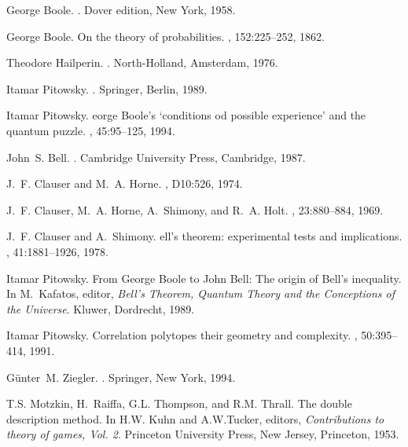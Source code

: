 \documentclass{epl}
\begin{document}
\begin{thebibliography}{10}

George Boole.
.
\newblock Dover edition, New York, 1958.

George Boole.
\newblock On the theory of probabilities.
,
  152:225--252, 1862.

Theodore Hailperin.
.
\newblock North-Holland, Amsterdam, 1976.

Itamar Pitowsky.
.
\newblock Springer, Berlin, 1989.

Itamar Pitowsky.
eorge {B}oole's `conditions od possible experience' and the
  quantum puzzle.
, 45:95--125, 1994.

John~S. Bell.
.
\newblock Cambridge University Press, Cambridge, 1987.

J.~F. Clauser and M.~A. Horne.
, D10:526, 1974.

J.~F. Clauser, M.~A. Horne, A.~Shimony, and R.~A. Holt.
, 23:880--884, 1969.

J.~F. Clauser and A.~Shimony.
ell's theorem: experimental tests and implications.
, 41:1881--1926, 1978.

Itamar Pitowsky.
\newblock From {G}eorge {B}oole to {J}ohn {B}ell: The origin of {B}ell's
  inequality.
\newblock In M.~Kafatos, editor, {\em {B}ell's Theorem, Quantum Theory and the
  Conceptions of the Universe}. Kluwer, Dordrecht, 1989.

Itamar Pitowsky.
\newblock Correlation polytopes their geometry and complexity.
, 50:395--414, 1991.

G{\"{u}}nter~M. Ziegler.
.
\newblock Springer, New York, 1994.

T.S. Motzkin, H.~Raiffa, G.L. Thompson, and R.M. Thrall.
\newblock The double description method.
\newblock In H.W. Kuhn and A.W.Tucker, editors, {\em Contributions to theory of
  games, Vol. 2}. Princeton University Press, New Jersey, Princeton, 1953.


\end{thebibliography}
\end{document}
